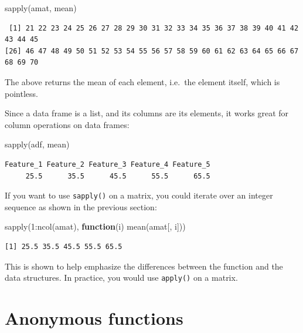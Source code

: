 \documentclass[
]{book}
\newenvironment{Shaded}{\begin{snugshade}}{\end{snugshade}}
\newcommand{\ControlFlowTok}[1]{\textcolor[rgb]{0.13,0.29,0.53}{\textbf{#1}}}
\newcommand{\DecValTok}[1]{\textcolor[rgb]{0.00,0.00,0.81}{#1}}
\newcommand{\FunctionTok}[1]{\textcolor[rgb]{0.00,0.00,0.00}{#1}}
\newcommand{\NormalTok}[1]{#1}
\newcommand{\SpecialCharTok}[1]{\textcolor[rgb]{0.00,0.00,0.00}{#1}}
\begin{document}
\begin{Shaded}
\begin{Highlighting}[]
\FunctionTok{sapply}\NormalTok{(amat, mean)}
\end{Highlighting}
\end{Shaded}

\begin{verbatim}
 [1] 21 22 23 24 25 26 27 28 29 30 31 32 33 34 35 36 37 38 39 40 41 42 43 44 45
[26] 46 47 48 49 50 51 52 53 54 55 56 57 58 59 60 61 62 63 64 65 66 67 68 69 70
\end{verbatim}

The above returns the mean of each element, i.e.~the element itself, which is pointless.

Since a data frame is a list, and its columns are its elements, it works great for column operations on data frames:

\begin{Shaded}
\begin{Highlighting}[]
\FunctionTok{sapply}\NormalTok{(adf, mean)}
\end{Highlighting}
\end{Shaded}

\begin{verbatim}
Feature_1 Feature_2 Feature_3 Feature_4 Feature_5 
     25.5      35.5      45.5      55.5      65.5 
\end{verbatim}

If you want to use \texttt{sapply()} on a matrix, you could iterate over an integer sequence as shown in the previous section:

\begin{Shaded}
\begin{Highlighting}[]
\FunctionTok{sapply}\NormalTok{(}\DecValTok{1}\SpecialCharTok{:}\FunctionTok{ncol}\NormalTok{(amat), }\ControlFlowTok{function}\NormalTok{(i) }\FunctionTok{mean}\NormalTok{(amat[, i]))}
\end{Highlighting}
\end{Shaded}

\begin{verbatim}
[1] 25.5 35.5 45.5 55.5 65.5
\end{verbatim}

This is shown to help emphasize the differences between the function and the data structures. In practice, you would use \texttt{apply()} on a matrix.

\hypertarget{anonymous-functions}{%
\section{Anonymous functions}\label{anonymous-functions}}
\end{document}
